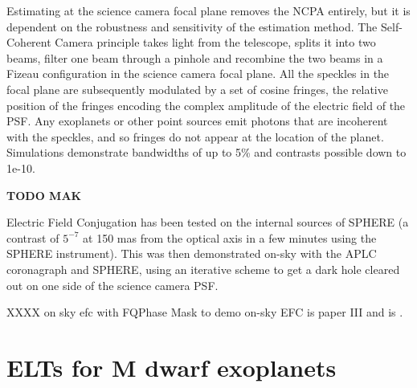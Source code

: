 \documentclass[letterpaper]{ar-1col}
\begin{document}
Estimating at the science camera focal plane removes the NCPA entirely, but it is dependent on the robustness and sensitivity of the estimation method.
%
The Self-Coherent Camera \citep[SCC; ][]{Baudoz06} principle takes light from the telescope, splits it into two beams, filter one beam through a pinhole and recombine the two beams in a Fizeau configuration in the science camera focal plane.
%
All the speckles in the focal plane are subsequently modulated by a set of cosine fringes, the relative position of the fringes encoding the complex amplitude of the electric field of the PSF.
%
Any exoplanets or other point sources emit photons that are incoherent with the speckles, and so fringes do not appear at the location of the planet.
%
Simulations demonstrate \citep{Galicher10} bandwidths of up to 5\% and contrasts possible down to 1e-10.
 
{\bf TODO MAK}







Electric Field Conjugation has been tested on the internal sources of SPHERE (a contrast of $5^{-7}$ at 150 mas from the optical axis in a few minutes using the SPHERE instrument).
%
This was then demonstrated on-sky with the APLC coronagraph and SPHERE, using an iterative scheme to get a dark hole cleared out on one side of the science camera PSF.



XXXX on sky efc with FQPhase Mask to demo on-sky EFC is paper III and is \citet{Galicher24}.

\section{ELTs for M dwarf exoplanets}
\end{document}
